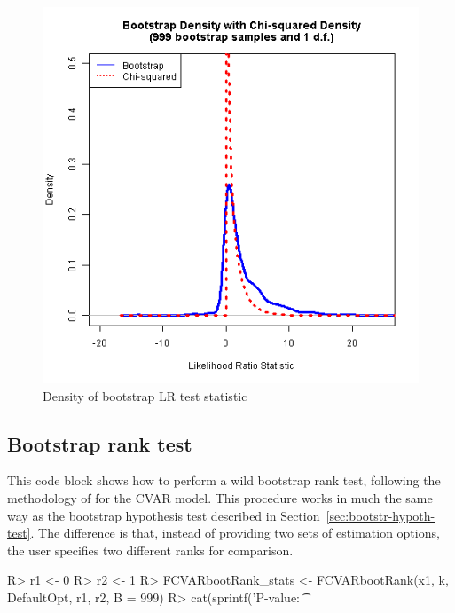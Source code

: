 \documentclass[article]{jss}
\begin{document}
\begin{figure}[tbh]
  \centering
  \includegraphics[scale = 1, keepaspectratio=true]{Figures/LRdensity_bw045.png}
  \caption{Density of bootstrap LR test statistic}
  \label{fig:BS}
\end{figure}


\subsection{Bootstrap rank test}
\label{sec:bootstrap-rank-test}

This code block
shows how to perform a wild bootstrap rank test, following the methodology of \cite{Cavaliere2010} for the CVAR model. This procedure works in much the same way as the bootstrap hypothesis test described in Section~\ref{sec:bootstr-hypoth-test}. The difference is that, instead of providing two sets of estimation options, the user specifies two different ranks for comparison.

\begin{Code}
R> r1 <- 0
R> r2 <- 1
R> FCVARbootRank_stats <- FCVARbootRank(x1, k, DefaultOpt, r1, r2, B = 999)
R> cat(sprintf('P-value: \t %
\end{Code}
\end{document}
